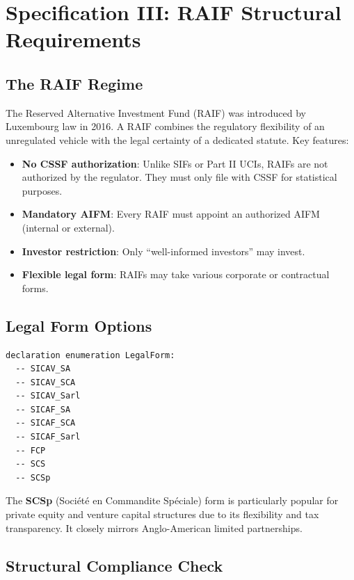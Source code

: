 
\section{Specification III: RAIF Structural Requirements}
\label{sec:raif}

\subsection{The RAIF Regime}
\label{sec:raif-regime}

The Reserved Alternative Investment Fund (RAIF) was introduced by Luxembourg law in 2016. A RAIF combines the regulatory flexibility of an unregulated vehicle with the legal certainty of a dedicated statute. Key features:

\begin{itemize}
  \item \textbf{No CSSF authorization}: Unlike SIFs or Part II UCIs, RAIFs are not authorized by the regulator. They must only file with CSSF for statistical purposes.
  \item \textbf{Mandatory AIFM}: Every RAIF must appoint an authorized AIFM (internal or external).
  \item \textbf{Investor restriction}: Only ``well-informed investors'' may invest.
  \item \textbf{Flexible legal form}: RAIFs may take various corporate or contractual forms.
\end{itemize}

\subsection{Legal Form Options}
\label{sec:legal-forms}

\begin{lstlisting}
declaration enumeration LegalForm:
  -- SICAV_SA
  -- SICAV_SCA
  -- SICAV_Sarl
  -- SICAF_SA
  -- SICAF_SCA
  -- SICAF_Sarl
  -- FCP
  -- SCS
  -- SCSp
\end{lstlisting}

The \textbf{SCSp} (Société en Commandite Spéciale) form is particularly popular for private equity and venture capital structures due to its flexibility and tax transparency. It closely mirrors Anglo-American limited partnerships.

\subsection{Structural Compliance Check}
\label{sec:raif-compliance}

